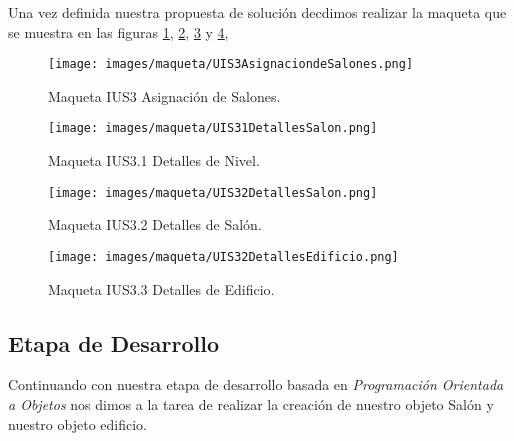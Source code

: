 Una vez definida nuestra propuesta de solución decdimos realizar la maqueta que se muestra en las figuras \ref{fig:maquetasalon1}, \ref{fig:maquetasalon2}, \ref{fig:maquetasalon3} y \ref{fig:maquetasalon4},   
\begin{figure}[h!]
	\begin{center}
		\texttt{[image: images/maqueta/UIS3AsignaciondeSalones.png]}
		\caption{Maqueta IUS3 Asignación de Salones.}
		\label{fig:maquetasalon1}
	\end{center}
\end{figure}
\begin{figure}[h!]
	\begin{center}
		\texttt{[image: images/maqueta/UIS31DetallesSalon.png]}
		\caption{Maqueta IUS3.1 Detalles de Nivel.}
		\label{fig:maquetasalon2}
	\end{center}
\end{figure}
\begin{figure}[h!]
	\begin{center}
		\texttt{[image: images/maqueta/UIS32DetallesSalon.png]}
		\caption{Maqueta IUS3.2 Detalles de Salón.}
		\label{fig:maquetasalon3}
	\end{center}
\end{figure}
\begin{figure}[h!]
	\begin{center}
		\texttt{[image: images/maqueta/UIS32DetallesEdificio.png]}
		\caption{Maqueta IUS3.3 Detalles de Edificio.}
		\label{fig:maquetasalon4}
	\end{center}
\end{figure}

\subsection{Etapa de Desarrollo}
Continuando con nuestra etapa de desarrollo basada en \textit{Programación Orientada a Objetos} nos dimos a la tarea de realizar la creación de nuestro objeto Salón y nuestro objeto edificio.

